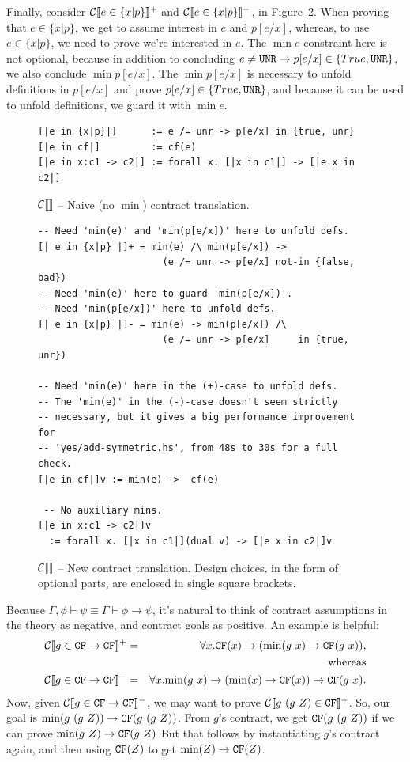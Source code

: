 \documentclass[preprint]{sigplanconf}
\begin{document}
{Finally, consider $\mathcal{C} \llbracket e \in \{x|p\} \rrbracket^+$ and $\mathcal{C} \llbracket e \in \{x|p\} \rrbracket^-$, in
Figure~\ref{fig:newCTrans}.  When proving that $e \in \{x|p\}$, we get to
assume interest in $e$ and $p[e/x]$, whereas, to use $e \in \{x|p\}$,
we need to prove we're interested in $e$.  The $\min{e}$ constraint
here is not optional, because in addition to concluding 
$e \neq \texttt{UNR} \to p[e/x] \in \{True,\texttt{UNR}\}$, we also conclude $\min{p[e/x]}$.
The $\min{p[e/x]}$ is necessary to unfold definitions in $p[e/x]$ and prove
$p[e/x] \in \{True,\texttt{UNR}\}$, and because it can be used to unfold definitions,
we guard it with $\min{e}$.
}

\begin{figure}
\begin{verbatim}
[|e in {x|p}|]      := e /= unr -> p[e/x] in {true, unr}
[|e in cf|]         := cf(e)
[|e in x:c1 -> c2|] := forall x. [|x in c1|] -> [|e x in c2|]
\end{verbatim}
\caption{$\mathcal{C} \llbracket  \rrbracket$ -- Naive (no $\min$) contract translation.}
\label{fig:naiveCTrans}
\end{figure}

\begin{figure}
\begin{verbatim}
-- Need 'min(e)' and 'min(p[e/x])' here to unfold defs.
[| e in {x|p} |]+ = min(e) /\ min(p[e/x]) ->
                      (e /= unr -> p[e/x] not-in {false, bad})
-- Need 'min(e)' here to guard 'min(p[e/x])'.
-- Need 'min(p[e/x])' here to unfold defs.
[| e in {x|p} |]- = min(e) -> min(p[e/x]) /\
                      (e /= unr -> p[e/x]     in {true, unr})

-- Need 'min(e)' here in the (+)-case to unfold defs.
-- The 'min(e)' in the (-)-case doesn't seem strictly
-- necessary, but it gives a big performance improvement for
-- 'yes/add-symmetric.hs', from 48s to 30s for a full check.
[|e in cf|]v := min(e) ->  cf(e)

 -- No auxiliary mins.
[|e in x:c1 -> c2|]v
  := forall x. [|x in c1|](dual v) -> [|e x in c2|]v
\end{verbatim}
\caption{$\mathcal{C} \llbracket  \rrbracket$ -- New contract translation. Design choices, in the form
of optional parts, are enclosed in single square brackets.}
\label{fig:newCTrans}
\end{figure}

Because $\Gamma,\phi \vdash \psi \equiv \Gamma \vdash \phi \to \psi$,
it's natural to think of contract assumptions in the theory as
negative, and contract goals as positive.  An example is helpful:
\protect \begin{eqnarray*}
\mathcal{C} \llbracket g \in \texttt{CF} \to \texttt{CF} \rrbracket^+ &=& \forall x. \texttt{CF}(x) \to (\mbox{min}(g ~x) \to \texttt{CF}(g ~x)),\\
&&\text{whereas}\\
\mathcal{C} \llbracket g \in \texttt{CF} \to \texttt{CF} \rrbracket^- &=& \forall x. \mbox{min}(g ~x) \to (\mbox{min}(x) \to \texttt{CF}(x)) \to \texttt{CF}(g ~x).
\end{eqnarray*}
Now, given $\mathcal{C} \llbracket g \in \texttt{CF} \to \texttt{CF} \rrbracket^-$, we may 
want to prove $\mathcal{C} \llbracket g ~(g ~Z) \in \texttt{CF} \rrbracket^+$.
So, our goal is $\mbox{min}(g ~(g ~Z)) \to \texttt{CF}(g ~(g ~Z))$.
From $g$'s contract, we get $\texttt{CF}(g ~(g ~Z))$ if we can prove 
$\mbox{min}(g ~Z) \to \texttt{CF}(g ~Z)$
But that follows by instantiating $g$'s contract again, and 
then using $\texttt{CF}(Z)$ to get $\mbox{min}(Z) \to \texttt{CF}(Z)$.
\end{document}
